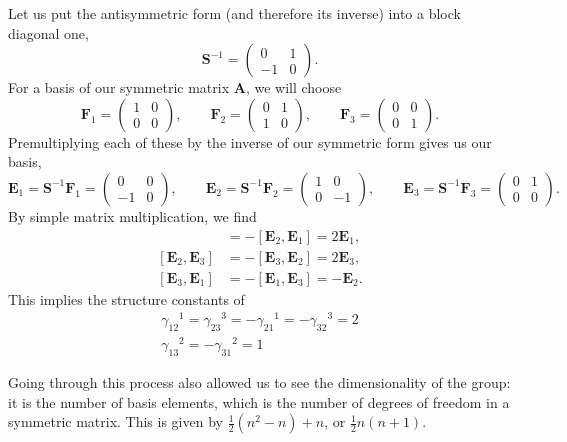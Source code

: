 \documentclass[../the-road-to-reality.tex]{subfiles}
\begin{document}
\begin{questions}
\begin{solution}
	Let us put the antisymmetric form (and therefore its inverse) into a block diagonal one,
	\[
		\mathbf{S}^{-1} = \begin{pmatrix} 0 & 1 \\ -1 & 0 \end{pmatrix} 
	.\] 
	For a basis of our symmetric matrix $\mathbf{A}$, we will choose
	\[
		\mathbf{F}_1 = \begin{pmatrix} 1 & 0 \\ 0 & 0 \end{pmatrix}, \qquad \mathbf{F}_2 = \begin{pmatrix} 0 & 1 \\ 1 & 0 \end{pmatrix},  \qquad \mathbf{F}_3 = \begin{pmatrix} 0 & 0 \\ 0 & 1 \end{pmatrix} 
	.\]
	Premultiplying each of these by the inverse of our symmetric form gives us our basis,
	\[
		\mathbf{E}_1 = \mathbf{S}^{-1}\mathbf{F}_1 = \begin{pmatrix} 0 & 0 \\ -1 & 0 \end{pmatrix}, \qquad \mathbf{E}_2 = \mathbf{S}^{-1}\mathbf{F}_2 = \begin{pmatrix} 1 & 0 \\ 0 & -1 \end{pmatrix}, \qquad \mathbf{E}_3 = \mathbf{S}^{-1}\mathbf{F}_3 = \begin{pmatrix} 0 & 1 \\ 0 & 0 \end{pmatrix} 
	.\] 
	By simple matrix multiplication, we find
	\begin{align*}
		[\mathbf{E}_1,\mathbf{E}_2] &= -[\mathbf{E}_2,\mathbf{E}_1] = 2\mathbf{E}_1, \\
		[\mathbf{E}_2,\mathbf{E}_3] &= -[\mathbf{E}_3,\mathbf{E}_2] = 2\mathbf{E}_3, \\
		[\mathbf{E}_3,\mathbf{E}_1] &= -[\mathbf{E}_1,\mathbf{E}_3] = -\mathbf{E}_2.
	\end{align*}
	This implies the structure constants of
	\begin{gather*}
		{\gamma_{12}}^1 = {\gamma_{23}}^3 = -{\gamma_{21}}^1 = -{\gamma_{32}}^3 = 2 \\
		{\gamma_{13}}^2 = -{\gamma_{31}}^2 = 1
	\end{gather*}

	Going through this process also allowed us to see the dimensionality of the group: it is the number of basis elements, which is the number of degrees of freedom in a symmetric matrix. This is given by $\frac{1}{2}(n^2 - n) + n$, or $\frac{1}{2}n(n+1)$.
\end{solution}


\end{questions}
\end{document}
